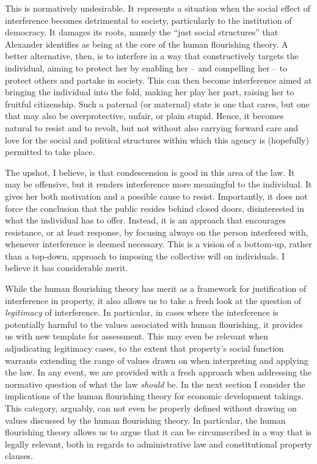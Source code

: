 This is normatively undesirable. It represents a situation when the social effect of interference becomes detrimental to society, particularly to the institution of democracy. It damages its roots, namely the ``just social structures'' that Alexander identifies as being at the core of the human flourishing theory. A better alternative, then, is to interfere in a way that constructively targets the individual, aiming to protect her by enabling her -- and compelling her -- to protect others and partake in society. This can then become interference aimed at bringing the individual into the fold, making her play her part, raising her to fruitful citizenship. Such a paternal (or maternal) state is one that cares, but one that may also be overprotective, unfair, or plain stupid. Hence, it becomes natural to resist and to revolt, but not without also carrying forward care and love for the social and political structures within which this agency is (hopefully) permitted to take place.

The upshot, I believe, is that condescension is good in this area of the law. It may be offensive, but it renders interference more meaningful to the individual. It gives her both motivation and a possible cause to resist. Importantly, it does not force the conclusion that the public resides behind closed doors, disinterested in what the individual has to offer. Instead, it is an approach that encourages resistance, or at least response, by focusing always on the person interfered with, whenever interference is deemed necessary. This is a vision of a bottom-up, rather than a top-down, approach to imposing the collective will on individuals. I believe it has considerable merit.

While the human flourishing theory has merit as a framework for justification of interference in property, it also allows us to take a fresh look at the question of {\it legitimacy} of interference. In particular, in cases where the interference is potentially harmful to the values associated with human flourishing, it provides us with new template for assessment. This may even be relevant when adjudicating legitimacy cases, to the extent that property's social function warrants extending the range of values drawn on when interpreting and applying the law. In any event, we are provided with a fresh approach when addressing the normative question of what the law {\it should} be. In the next section I consider the implications of the human flourishing theory for economic development takings. This category, arguably, can not even be properly defined without drawing on values discussed by the human flourishing theory. In particular, the human flourishing theory allows us to argue that it can be circumscribed in a way that is legally relevant, both in regards to administrative law and constitutional property clauses.


